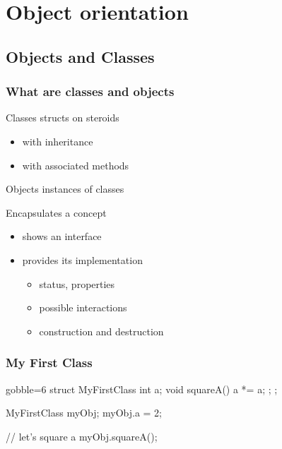 \section[OO]{Object orientation}

\subsection{Objects and Classes}

\begin{frame}[fragile]
  \frametitle{What are classes and objects}
  \begin{block}{Classes}
    structs on steroids
    \begin{itemize}
    \item with inheritance
    \item with associated methods
    \end{itemize}
  \end{block}
  \begin{block}{Objects}
    instances of classes
  \end{block}
  \begin{block}{Encapsulates a concept}
    \begin{itemize}
    \item shows an interface
    \item provides its implementation
      \begin{itemize}
      \item status, properties
      \item possible interactions
      \item construction and destruction
      \end{itemize}    
    \end{itemize}    
  \end{block}
\end{frame}


\begin{frame}[fragile]
  \frametitle{My First Class}
  \begin{multicols}{2}
    \begin{cppcode*}{gobble=6}
      struct MyFirstClass {
        int a;
        void squareA() {
          a *= a;
        };
      };

      MyFirstClass myObj;
      myObj.a = 2;

      // let's square a
      myObj.squareA();
    \end{cppcode*}
    \columnbreak
    \center
    \null \vfill
    \vfill \null
  \end{multicols}
\end{frame}

